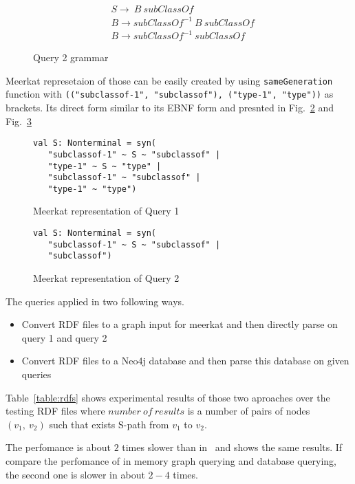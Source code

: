 \begin{figure}[h]
\begin{align*}
& S \rightarrow\ B\ subClassOf\\
& B \rightarrow subClassOf^{-1}\ B\ subClassOf\\
& B \rightarrow subClassOf^{-1}\ subClassOf
\end{align*}
\caption{Query 2 grammar}
\label{fig:query2}
\end{figure}

Meerkat represetaion of those can be easily created by using \lstinline{sameGeneration} function with \lstinline{(("subclassof-1", "subclassof"), ("type-1", "type"))} as brackets. Its direct form similar to its EBNF form and presnted in Fig.~\ref{fig:query1Meerkat} and Fig.~\ref{fig:query2Meerkat}

\begin{figure}[h]
\begin{lstlisting}
val S: Nonterminal = syn(
   "subclassof-1" ~ S ~ "subclassof" |
   "type-1" ~ S ~ "type" |
   "subclassof-1" ~ "subclassof" |
   "type-1" ~ "type")
\end{lstlisting}
\caption{Meerkat representation of Query 1}
\label{fig:query1Meerkat}
\end{figure}

\begin{figure}[h]
\begin{lstlisting}
val S: Nonterminal = syn(
   "subclassof-1" ~ S ~ "subclassof" |
   "subclassof")
\end{lstlisting}
\caption{Meerkat representation of Query 2}
\label{fig:query2Meerkat}
\end{figure}

The queries applied in two following ways.
\begin{itemize}
    \item Convert RDF files to a graph input for meerkat and then directly parse on query 1 and query 2
    \item Convert RDF files to a Neo4j database and then parse this database on given queries
\end{itemize} 

Table~\ref{table:rdfs} shows experimental results of those two aproaches over the testing RDF files where $number\ of\ results$ is a number of pairs of nodes $(v_1,\ v_2)$ such that exists S-path from $v_1$ to $v_2$.

The perfomance is about $2$ times slower than in~\cite{GrigorevR16} and shows the same results.
If compare the perfomance of in memory graph querying and database querying, the second one is slower in about $2-4$ times.


